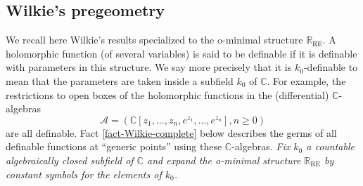\documentclass[12pt]{amsart}
\theoremstyle{definition}
\theoremstyle{plain}
\theoremstyle{exampstyle}\newtheorem{thmx}{Theorem}
\theoremstyle{exampstyle}\newtheorem{thmxbis}{Theorem}
\begin{document}
\subsection{Wilkie's pregeometry}  We recall here Wilkie's results specialized to the o-minimal structure $\mathbb{R}_{\mathrm{RE}}$. A holomorphic function (of several variables) is said to be definable if it is definable with parameters in this structure. We say more precisely that it is $k_0$-definable to mean that the parameters are taken inside a subfield $k_0$ of $\mathbb{C}$. For example, the restrictions to open boxes of the holomorphic functions in the (differential) $\mathbb{C}$-algebras  $$\mathcal A = ( \mathbb{C}[z_1,\ldots,z_n,e^{z_1},\ldots, e^{z_n}], n \geq 0 )$$
are all definable. Fact \ref{fact-Wilkie-complete} below describes the germs of all definable functions at ``generic points'' using these $\mathbb{C}$-algebras. {\em Fix $k_0$ a countable algebraically closed subfield of $\mathbb{C}$ and expand the o-minimal structure $\mathbb{R}_\mathrm{RE}$ by constant symbols for the elements of $k_0$.}
\end{document}
